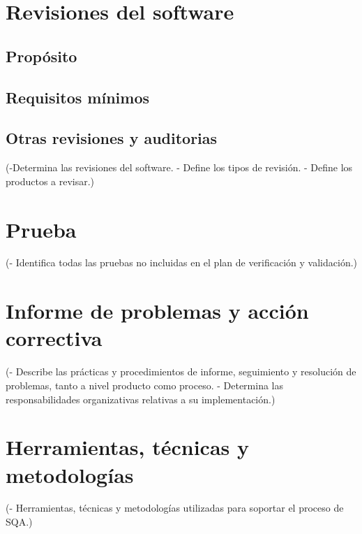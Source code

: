 \documentclass[spanish,a4paper,11pt, twoside]{report}	%
\begin{document}
\chapter{ Revisiones del software}
	\section{Propósito}
	\section{Requisitos mínimos}
	\section{Otras revisiones y auditorias}

	(-Determina las revisiones del software.
	- Define los tipos de revisión.
	- Define los productos a revisar.)

\newpage
\mbox{}
\thispagestyle{empty}						%
\newpage

\chapter{ Prueba}
	(- Identifica todas las pruebas no incluidas en el plan
	de verificación y validación.)

\newpage
\mbox{}
\thispagestyle{empty}						%
\newpage

\chapter{ \hspace{0.25cm}Informe de problemas y acción correctiva}
	(- Describe las prácticas y procedimientos de informe,
	seguimiento y resolución de problemas, tanto a nivel	
	producto como proceso.
	- Determina las responsabilidades organizativas
	relativas a su implementación.)

\newpage
\mbox{}
\thispagestyle{empty}						%
\newpage

\chapter{ Herramientas, técnicas y metodologías}
	(- Herramientas, técnicas y metodologías utilizadas
	para soportar el proceso de SQA.)

\newpage
\mbox{}
\thispagestyle{empty}						%
\newpage
\end{document}
